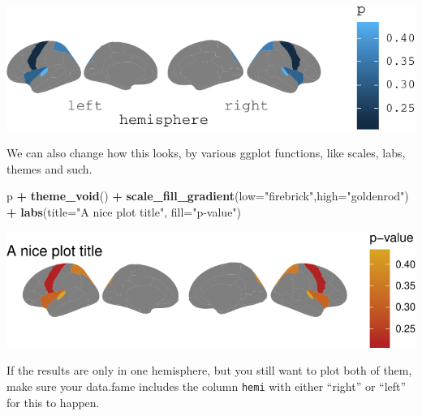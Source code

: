 \documentclass[fleqn,10pt]{wlpeerj} %
\newenvironment{Shaded}{\begin{snugshade}}{\end{snugshade}}
\newcommand{\DataTypeTok}[1]{\textcolor[rgb]{0.13,0.29,0.53}{#1}}
\newcommand{\KeywordTok}[1]{\textcolor[rgb]{0.13,0.29,0.53}{\textbf{#1}}}
\newcommand{\NormalTok}[1]{#1}
\newcommand{\OperatorTok}[1]{\textcolor[rgb]{0.81,0.36,0.00}{\textbf{#1}}}
\newcommand{\StringTok}[1]{\textcolor[rgb]{0.31,0.60,0.02}{#1}}
\begin{document}
\includegraphics{draft_1_files/figure-latex/datasupp-1.pdf}

We can also change how this looks, by various ggplot functions, like scales, labs, themes and such.

\begin{Shaded}
\begin{Highlighting}[]
\NormalTok{p }\OperatorTok{+}
\StringTok{  }\KeywordTok{theme_void}\NormalTok{() }\OperatorTok{+}
\StringTok{  }\KeywordTok{scale_fill_gradient}\NormalTok{(}\DataTypeTok{low=}\StringTok{"firebrick"}\NormalTok{,}\DataTypeTok{high=}\StringTok{"goldenrod"}\NormalTok{) }\OperatorTok{+}
\StringTok{  }\KeywordTok{labs}\NormalTok{(}\DataTypeTok{title=}\StringTok{"A nice plot title"}\NormalTok{, }\DataTypeTok{fill=}\StringTok{"p-value"}\NormalTok{)}
\end{Highlighting}
\end{Shaded}

\includegraphics{draft_1_files/figure-latex/datasupp2-1.pdf}

If the results are only in one hemisphere, but you still want to plot both of them, make sure your data.fame includes the column \texttt{hemi} with either ``right'' or ``left'' for this to happen.

\begin{Shaded}
\end{Shaded}
\end{document}
